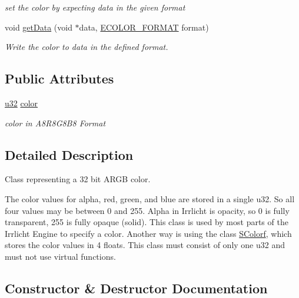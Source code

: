 \begin{DoxyCompactItemize}
\begin{DoxyCompactList}\small\item\em set the color by expecting data in the given format \end{DoxyCompactList}\item 
void \hyperlink{classirr_1_1video_1_1SColor_a7cba1b914230289de9c91ff28be96bc9}{get\+Data} (void $\ast$data, \hyperlink{namespaceirr_1_1video_a1d5e487888c32b1674a8f75116d829ed}{E\+C\+O\+L\+O\+R\+\_\+\+F\+O\+R\+M\+AT} format)
\begin{DoxyCompactList}\small\item\em Write the color to data in the defined format. \end{DoxyCompactList}\end{DoxyCompactItemize}
\subsection*{Public Attributes}
\begin{DoxyCompactItemize}
\item 
\mbox{\label{classirr_1_1video_1_1SColor_a11f2b41eeff9e7f688d322735ca2cfcf}} 
\hyperlink{namespaceirr_a0416a53257075833e7002efd0a18e804}{u32} \hyperlink{classirr_1_1video_1_1SColor_a11f2b41eeff9e7f688d322735ca2cfcf}{color}
\begin{DoxyCompactList}\small\item\em color in A8\+R8\+G8\+B8 Format \end{DoxyCompactList}\end{DoxyCompactItemize}


\subsection{Detailed Description}
Class representing a 32 bit A\+R\+GB color. 

The color values for alpha, red, green, and blue are stored in a single u32. So all four values may be between 0 and 255. Alpha in Irrlicht is opacity, so 0 is fully transparent, 255 is fully opaque (solid). This class is used by most parts of the Irrlicht Engine to specify a color. Another way is using the class \hyperlink{classirr_1_1video_1_1SColorf}{S\+Colorf}, which stores the color values in 4 floats. This class must consist of only one u32 and must not use virtual functions. 

\subsection{Constructor \& Destructor Documentation}
\mbox{\label{classirr_1_1video_1_1SColor_ab001c0c2515ff5f8a0b324d1345485f4}} 
